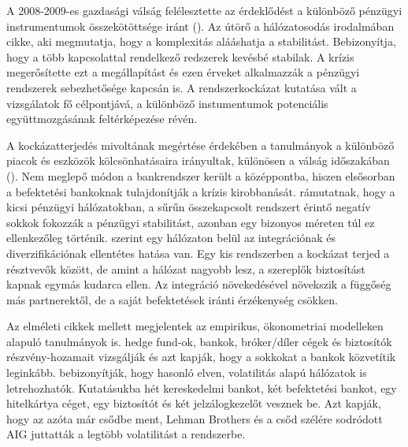 \documentclass[12pt,bibliography=totoc]{article}
\begin{document}
A 2008-2009-es gazdasági válság felélesztette az érdeklődést a különböző pénzügyi instrumentumok összekötöttsége iránt (\cite{aloui2011global}). Az útörő a hálózatosodás irodalmában \cite{may1972will} cikke, aki megmutatja, hogy a komplexitás alááshatja a stabilitást. Bebizonyítja, hogy a több kapcsolattal rendelkező redszerek kevésbé stabilak. A krízis megerősítette ezt a megállapítást és \cite{haldane2011systemic} ezen érveket alkalmazzák a pénzügyi rendszerek sebezhetősége kapcsán is. A rendszerkockázat kutatása vált a vizsgálatok fő célpontjává, a különböző instumentumok potenciális együttmozgásának feltérképezése révén.

A kockázatterjedés mivoltának megértése érdekében a tanulmányok a különböző piacok és eszközök kölcsönhatásaira irányultak, különösen a válság időszakában (\cite{bisias2012survey}). Nem meglepő módon a bankrendszer került a középpontba, hiszen elsősorban a befektetési bankoknak tulajdonítják a krízis kirobbanását.
\cite{acemoglu2015systemic} rámutatnak, hogy a kicsi pénzügyi hálózatokban, a sűrűn összekapcsolt rendszert érintő negatív sokkok fokozzák a pénzügyi stabilitást, azonban egy bizonyos méreten túl ez ellenkezőleg történik. 
\cite{elliott2014financial} szerint egy hálózaton belül az integrációnak és diverzifikációnak ellentétes hatása van. Egy kis rendszerben a kockázat terjed a résztvevők között, de amint a hálózat nagyobb lesz, a szereplők biztosítást kapnak egymás kudarca ellen. Az integráció növekedésével növekszik a függőség más partnerektől, de a saját befektetések iránti érzékenység csökken. 

Az elméleti cikkek mellett megjelentek az empirikus, ökonometriai modelleken alapuló tanulmányok is. \cite{billio2012econometric} hedge fund-ok, bankok, bróker/díler cégek és biztosítók részvény-hozamait vizsgálják és azt kapják, hogy a sokkokat a bankok közvetítik leginkább. \cite{diebold2014network} bebizonyítják, hogy hasonló elven, volatilitás alapú hálózatok is letrehozhatók. Kutatásukba hét kereskedelmi bankot, két befektetési bankot, egy hitelkártya céget, egy biztosítót és két jelzálogkezelőt vesznek be. Azt kapják, hogy az azóta már csődbe ment, Lehman Brothers és a csőd szélére sodródott AIG juttatták a legtöbb volatilitást a rendszerbe.
\end{document}
